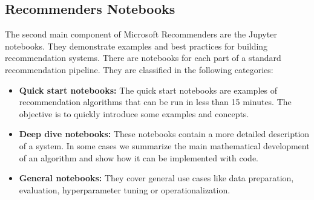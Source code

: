 \subsection{Recommenders Notebooks}

The second main component of Microsoft Recommenders are the Jupyter notebooks. 
They demonstrate examples and best practices for building recommendation systems.
There are notebooks for each part of a standard recommendation pipeline. They are
classified in the following categories:
\begin{itemize}
    \item \textbf{Quick start notebooks:} The quick start notebooks are examples of recommendation algorithms that 
    can be run in less than 15 minutes. The objective is to quickly introduce some examples and concepts.
    \item \textbf{Deep dive notebooks:} These notebooks contain a more detailed description of a system. In some cases
    we summarize the main mathematical development of an algorithm and show how it can be implemented with code.
    \item \textbf{General notebooks:} They cover general use cases like data preparation, evaluation, hyperparameter
    tuning or operationalization.
\end{itemize}

